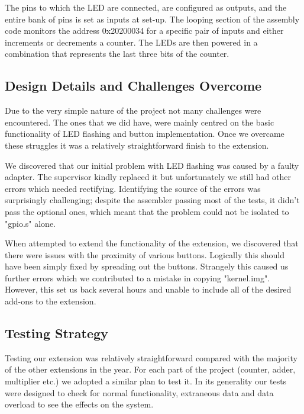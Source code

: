 \documentclass[a4paper,12pt]{article}
\begin{document}
The pins to which the LED are connected, are configured as outputs, and the entire bank of pins is set as inputs at set-up. The looping section of the assembly code monitors the address 0x20200034 for a specific pair of inputs and either increments or decrements a counter. The LEDs are then powered in a combination that represents the last three bits of the counter.

\subsection{Design Details and Challenges Overcome}

Due to the very simple nature of the project not many challenges were encountered. The ones that we did have, were mainly centred on the basic functionality of LED flashing and button implementation. Once we overcame these struggles it was a relatively straightforward finish to the extension.

We discovered that our initial problem with LED flashing was caused by a faulty adapter. The supervisor kindly replaced it but unfortunately we still had other errors which needed rectifying. Identifying the source of the errors was surprisingly challenging; despite the assembler passing most of the tests, it didn't pass the optional ones, which meant that the problem could not be isolated to "gpio.s" alone.

When attempted to extend the functionality of the extension, we discovered that there were issues with the proximity of various buttons. Logically this should have been simply fixed by spreading out the buttons. Strangely this caused us further errors which we contributed to a mistake in copying "kernel.img". However, this set us back several hours and unable to include all of the desired add-ons to the extension.

\subsection{Testing Strategy}

Testing our extension was relatively straightforward compared with the majority of the other extensions in the year. For each part of the project (counter, adder, multiplier etc.) we adopted a similar plan to test it. In its generality our tests were designed to check for normal functionality, extraneous data and data overload to see the effects on the system.
\end{document}

